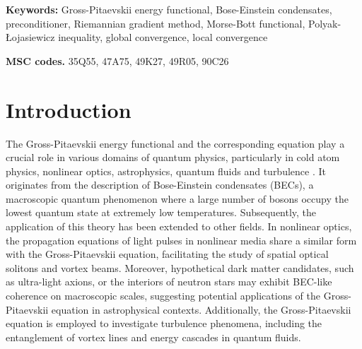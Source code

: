 \documentclass[preprint,3p]{elsarticle}
\begin{document}
{\bf Keywords:} Gross-Pitaevskii energy functional, Bose-Einstein condensates, preconditioner, Riemannian gradient method, Morse-Bott functional, Polyak-\L ojasiewicz inequality, global convergence, local convergence

\vspace{6pt}
{\bf MSC codes.} 35Q55, 47A75, 49K27, 49R05, 90C26 
\normalsize



 




\section{Introduction}
\setcounter{equation}{0}

The Gross-Pitaevskii energy functional and the corresponding equation play a crucial role in various domains of quantum physics, particularly in cold atom physics, nonlinear optics, astrophysics, quantum fluids and turbulence \cite{1995Observation,2014Intro,2013Quan, K1995Bose,2000Fuzzy,Klaers2010Bose}. It originates from the description of Bose-Einstein condensates (BECs), a macroscopic quantum phenomenon where a large number of bosons occupy the lowest quantum state at extremely low temperatures. Subsequently, the application of this theory has been extended to other fields. In nonlinear optics, the propagation equations of light pulses in nonlinear media share a similar form with the Gross-Pitaevskii equation, facilitating the study of spatial optical solitons and vortex beams. Moreover, hypothetical dark matter candidates, such as ultra-light axions, or the interiors of neutron stars may exhibit BEC-like coherence on macroscopic scales, suggesting potential applications of the Gross-Pitaevskii equation in astrophysical contexts. Additionally, the Gross-Pitaevskii equation is employed to investigate turbulence phenomena, including the entanglement of vortex lines and energy cascades in quantum fluids. 
\end{document}
